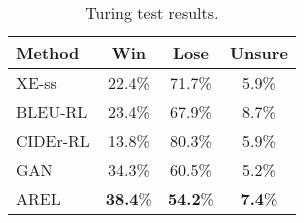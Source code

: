 \documentclass[11pt,a4paper]{article}
\begin{document}
\begin{table} \small
\begin{center}
  \begin{tabular}{ l | c  c  c}
  
    Method     & Win & Lose & Unsure \\
    \hline
    XE-ss     & 22.4\% & 71.7\% & 5.9\% \\
    BLEU-RL    & 23.4\% & 67.9\% & 8.7\% \\
    CIDEr-RL& 13.8\% & 80.3\% & 5.9\% \\
    GAN        & 34.3\% & 60.5\% & 5.2\% \\
    \hline
    AREL     & \textbf{38.4}\% & \textbf{54.2}\% & \textbf{7.4}\% \\ 
    
  \end{tabular}
\end{center}
\caption{Turing test results.}
\label{table:turing}
\end{table}
\end{document}
